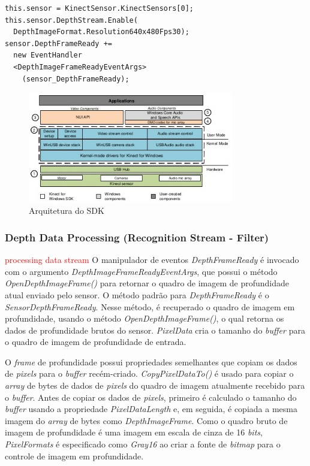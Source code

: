 \begin{verbatim}
this.sensor = KinectSensor.KinectSensors[0];
this.sensor.DepthStream.Enable(
  DepthImageFormat.Resolution640x480Fps30);
sensor.DepthFrameReady +=
  new EventHandler
  <DepthImageFrameReadyEventArgs>
    (sensor_DepthFrameReady);
\end{verbatim}


\begin{figure}[ht]
\centering
\includegraphics[width=0.8\textwidth]{images/sdk_architecture_color.png}
\caption{Arquitetura do SDK}
\label{fig:sdk_architecture_color}
\end{figure}


\subsubsection{Depth Data Processing (Recognition Stream - Filter)}\label{sec:depthDataProcessing}
\textcolor{red}{processing data stream}
O manipulador de eventos \textit{DepthFrameReady} é invocado com o argumento \textit{DepthImageFrameReadyEventArgs}, que possui o método \textit{OpenDepthImageFrame()} para retornar o quadro de imagem de profundidade atual enviado pelo sensor. O  método padrão para \textit{DepthFrameReady} é o \textit{SensorDepthFrameReady}. Nesse método, é recuperado o quadro de imagem em profundidade, usando o método \textit{OpenDepthImageFrame()}, o qual retorna os dados de profundidade brutos do sensor. \textit{PixelData} cria o tamanho do \textit{buffer} para o quadro de imagem de profundidade de entrada.

O \textit{frame} de profundidade possui propriedades semelhantes que copiam os dados de \textit{pixels} para o \textit{buffer} recém-criado. \textit{CopyPixelDataTo()} é usado para copiar o \textit{array} de bytes de dados de \textit{pixels} do quadro de imagem atualmente recebido para o \textit{buffer}. Antes de copiar os dados de \textit{pixels}, primeiro é calculado o tamanho do \textit{buffer} usando a propriedade \textit{PixelDataLength} e, em seguida, é copiada a mesma imagem do \textit{array} de bytes como \textit{DepthImageFrame}. Como o quadro bruto de imagem de profundidade é uma imagem em escala de cinza de 16 \textit{bits}, \textit{PixelFormats} é especificado  como \textit{Gray16} ao criar a fonte de \textit{bitmap} para o controle de imagem em profundidade.

